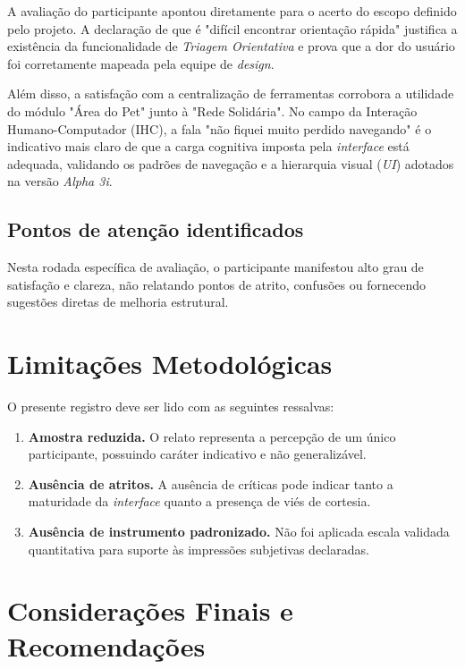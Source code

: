 \documentclass[12pt,a4paper]{article}
\begin{document}
A avaliação do participante apontou diretamente para o acerto do escopo definido pelo projeto. A declaração de que é "difícil encontrar orientação rápida" justifica a existência da funcionalidade de \textit{Triagem Orientativa} e prova que a dor do usuário foi corretamente mapeada pela equipe de \textit{design}.

Além disso, a satisfação com a centralização de ferramentas corrobora a utilidade do módulo "Área do Pet" junto à "Rede Solidária". No campo da Interação Humano-Computador (IHC), a fala "não fiquei muito perdido navegando" é o indicativo mais claro de que a carga cognitiva imposta pela \textit{interface} está adequada, validando os padrões de navegação e a hierarquia visual (\textit{UI}) adotados na versão \textit{Alpha 3i}.

\subsection{Pontos de atenção identificados}

Nesta rodada específica de avaliação, o participante manifestou alto grau de satisfação e clareza, não relatando pontos de atrito, confusões ou fornecendo sugestões diretas de melhoria estrutural.

\section{Limitações Metodológicas}

O presente registro deve ser lido com as seguintes ressalvas:

\begin{enumerate}[label=\textbf{\arabic*.}, leftmargin=*]
  \item \textbf{Amostra reduzida.} O relato representa a percepção de um único participante, possuindo caráter indicativo e não generalizável.
  \item \textbf{Ausência de atritos.} A ausência de críticas pode indicar tanto a maturidade da \textit{interface} quanto a presença de viés de cortesia.
  \item \textbf{Ausência de instrumento padronizado.} Não foi aplicada escala validada quantitativa para suporte às impressões subjetivas declaradas.
\end{enumerate}

\section{Considerações Finais e Recomendações}
\end{document}
